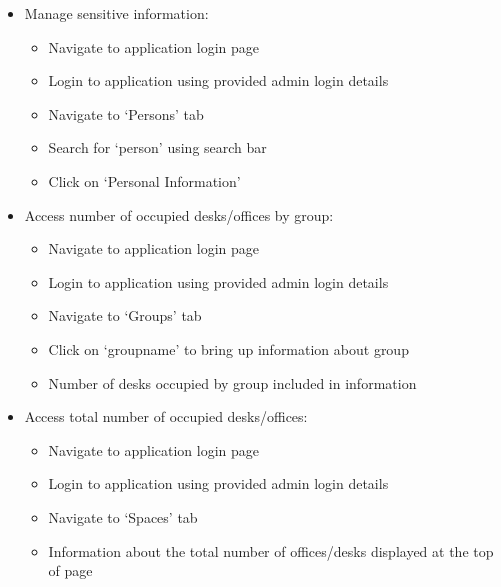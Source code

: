\documentclass[11pt,a4paper]{article}
\begin{document}
\begin{itemize}
\begin{itemize}
    \end{itemize}
  \item Manage sensitive information:
    \begin{itemize}
      \item Navigate to application login page
      \item Login to application using provided admin login details
      \item Navigate to ‘Persons’ tab
      \item Search for ‘person’ using search bar
      \item Click on ‘Personal Information’
    \end{itemize}
  \item Access number of occupied desks/offices by group:
    \begin{itemize}
      \item Navigate to application login page
      \item Login to application using provided admin login details
      \item Navigate to ‘Groups’ tab
      \item Click on ‘groupname’ to bring up information about group
      \item Number of desks occupied by group included in information
    \end{itemize}
  \item Access total number of occupied desks/offices:
    \begin{itemize}
      \item Navigate to application login page
      \item Login to application using provided admin login details
      \item Navigate to ‘Spaces’ tab
      \item Information about the total number of offices/desks displayed at the top of page
    \end{itemize}
\end{itemize}
\end{document}
